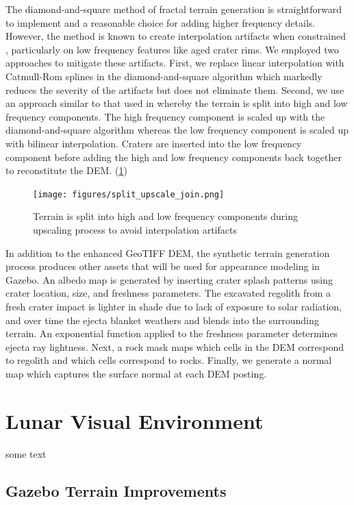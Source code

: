 \documentclass[twocolumn,letterpaper]{IEEEAerospaceCLS}  %
\begin{document}
The diamond-and-square method of fractal terrain generation is straightforward to implement and a reasonable choice for adding higher frequency details. 
However, the method is known to create interpolation artifacts when constrained \cite{miller1986definition}, particularly on low frequency features like aged crater rims. 
We employed two approaches to mitigate these artifacts. 
First, we replace linear interpolation with Catmull-Rom splines in the diamond-and-square algorithm which markedly reduces the severity of the artifacts but does not eliminate them.
Second, we use an approach similar to that used in \cite{shankar2008lunar} whereby the terrain is split into high and low frequency components.
The high frequency component is scaled up with the diamond-and-square algorithm whereas the low frequency component is scaled up with bilinear interpolation. 
Craters are inserted into the low frequency component before adding the high and low frequency components back together to reconstitute the DEM. (\cref{fig:split_upscale_join})

\begin{figure}[h!]
  \texttt{[image: figures/split\_upscale\_join.png]}
    \caption{Terrain is split into high and low frequency components during upscaling process to avoid interpolation artifacts}
    \label{fig:split_upscale_join}
\end{figure}

In addition to the enhanced GeoTIFF DEM, the synthetic terrain generation process produces other assets that will be used for appearance modeling in Gazebo. 
An albedo map is generated by inserting crater splash patterns using crater location, size, and freshness parameters. 
The excavated regolith from a fresh crater impact is lighter in shade due to lack of exposure to solar radiation, and over time the ejecta blanket weathers and blends into the surrounding terrain. 
An exponential function applied to the freshness parameter determines ejecta ray lightness. 
Next, a rock mask maps which cells in the DEM correspond to regolith and which cells correspond to rocks. 
Finally, we generate a normal map which captures the surface normal at each DEM posting. 


\section{Lunar Visual Environment}
some text

\subsection{Gazebo Terrain Improvements}
\end{document}
